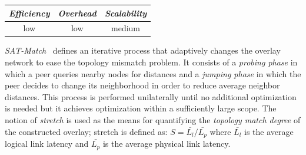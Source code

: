 \begin{center}
{\footnotesize
\begin{tabular}{ccc}
\emph{Efficiency} & \emph{Overhead} & \emph{Scalability} \\
\hline
% 
low &
% 
low &
% 
medium
\end{tabular}
}
\end{center}


\emph{SAT-Match}~\cite{RGJZ2004} defines an iterative process that 
adaptively changes the overlay network to ease the topology mismatch problem. 
It consists of a \emph{probing phase} in which a peer queries nearby nodes 
for distances and a \emph{jumping phase} in which the peer decides 
to change its neighborhood in order to reduce average neighbor distances. 
This process is performed unilaterally
until no additional optimization is needed but it achieves optimization within a
sufficiently large scope.
The notion of \emph{stretch} is used as the means for quantifying 
the \emph{topology match degree} of the constructed overlay;
stretch is defined as: 
$S = \bar{L_l}/\bar{L_p}$ where $\bar{L_l}$ is the average logical link
latency and $\bar{L_p}$ is the average physical link latency.
% 

